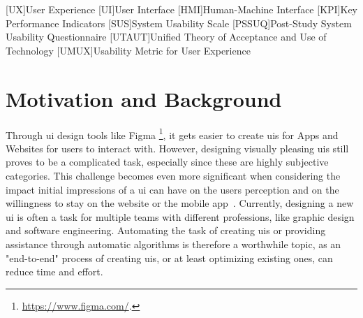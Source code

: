 \documentclass[10pt,a4paper]{scrartcl} %
\begin{document}
\pagestyle{plain}
\title{\rmfamily\normalfont{}}
\subtitle{\rmfamily{}}
\author{}

\maketitle
\begin{acronym}
    [UX]{User Experience}
    [UI]{User Interface}
    [HMI]{Human-Machine Interface}
    [KPI]{Key Performance Indicators}
    [SUS]{System Usability Scale}
    [PSSUQ]{Post-Study System Usability Questionnaire}
    [UTAUT]{Unified Theory of Acceptance and Use of Technology}
    [UMUX]{Usability Metric for User Experience}
\end{acronym}

\section{Motivation and Background}
Through \ac{ui} design tools like Figma \footnote{\url{https://www.figma.com/}.}, it gets easier to create \acp{ui} for Apps and Websites for users to interact with. However, designing visually pleasing \acp{ui} still 
proves to be a complicated task, especially since these are highly subjective categories. \cite{vonwangenheim2018agree}
This challenge becomes even more significant when considering the impact initial 
impressions of a \ac{ui} can have on the users perception and on the willingness to stay on 
the website or the mobile app~\cite{effects_of_website_designs}. Currently, designing a 
new \ac{ui} is often a task for multiple teams with different professions, 
like graphic design and software engineering. 
 Automating the task of creating \acp{ui} or providing assistance through automatic algorithms is therefore a worthwhile topic, as an "end-to-end" process of creating \acp{ui}, or at least optimizing existing ones, can reduce time and effort.
\end{document}
